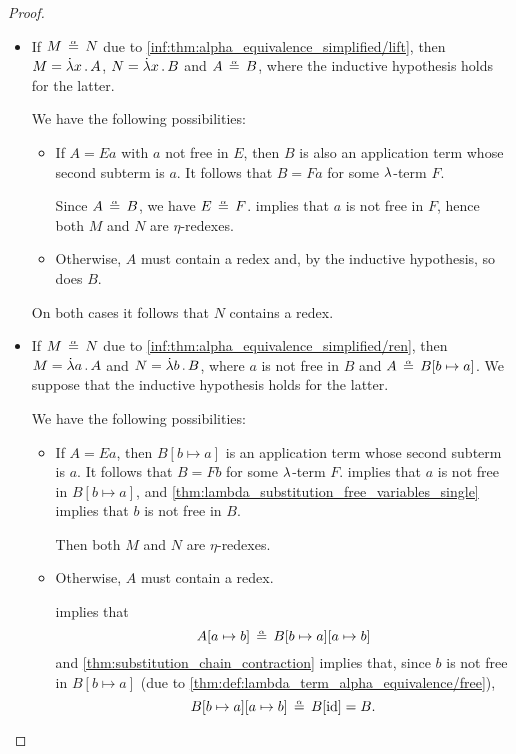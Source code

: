 \begin{proof}
\begin{itemize}
    \item If \( M \aequiv N \) due to \ref{inf:thm:alpha_equivalence_simplified/lift}, then \( M = \qabs x A \), \( N = \qabs x B \) and \( A \aequiv B \), where the inductive hypothesis holds for the latter.

    We have the following possibilities:
    \begin{itemize}
      \item If \( A = Ea \) with \( a \) not free in \( E \), then \( B \) is also an application term whose second subterm is \( a \). It follows that \( B = Fa \) for some \( {\mathrm \lambda} \)-term \( F \).

      Since \( A \aequiv B \), we have \( E \aequiv F \).  implies that \( a \) is not free in \( F \), hence both \( M \) and \( N \) are \( \eta \)-redexes.

      \item Otherwise, \( A \) must contain a redex and, by the inductive hypothesis, so does \( B \).
    \end{itemize}

    On both cases it follows that \( N \) contains a redex.

    \item If \( M \aequiv N \) due to \ref{inf:thm:alpha_equivalence_simplified/ren}, then \( M = \qabs a A \) and \( N = \qabs b B \), where \( a \) is not free in \( B \) and \( A \aequiv B[b \mapsto a] \). We suppose that the inductive hypothesis holds for the latter.

    We have the following possibilities:
    \begin{itemize}
      \item If \( A = Ea \), then \( B[b \mapsto a] \) is an application term whose second subterm is \( a \). It follows that \( B = Fb \) for some \( {\mathrm \lambda} \)-term \( F \).  implies that \( a \) is not free in \( B[b \mapsto a] \), and \cref{thm:lambda_substitution_free_variables_single} implies that \( b \) is not free in \( B \).

      Then both \( M \) and \( N \) are \( \eta \)-redexes.

      \item Otherwise, \( A \) must contain a redex.

       implies that
      \begin{equation*}
        A[a \mapsto b] \aequiv B[b \mapsto a][a \mapsto b]
      \end{equation*}
      and \cref{thm:substitution_chain_contraction} implies that, since \( b \) is not free in \( B[b \mapsto a] \) (due to \cref{thm:def:lambda_term_alpha_equivalence/free}),
      \begin{equation*}
        B[b \mapsto a][a \mapsto b] \aequiv B[\id] = B.
      \end{equation*}


\end{itemize}
\end{itemize}
\end{proof}

